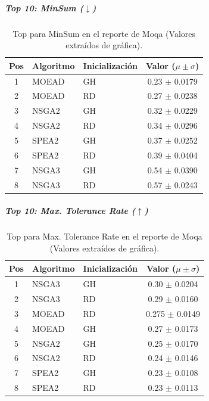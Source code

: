 \documentclass[a4paper,10pt]{article}
\begin{document}
\subparagraph{Top 10: MinSum ($\downarrow$)}
\begin{table}[H]
    \centering
    \begin{tabular}{cllc}
        \toprule
        Pos & Algoritmo & Inicialización & Valor ($\mu \pm \sigma$) \\
        \midrule
        1 & MOEAD & GH & 0.23 $\pm$ 0.0179 \\
        2 & MOEAD & RD & 0.27 $\pm$ 0.0238 \\
        3 & NSGA2 & GH & 0.32 $\pm$ 0.0229 \\
        4 & NSGA2 & RD & 0.34 $\pm$ 0.0296 \\
        5 & SPEA2 & GH & 0.37 $\pm$ 0.0252 \\
        6 & SPEA2 & RD & 0.39 $\pm$ 0.0404 \\
        7 & NSGA3 & GH & 0.54 $\pm$ 0.0390 \\
        8 & NSGA3 & RD & 0.57 $\pm$ 0.0243 \\
        \bottomrule
    \end{tabular}
    \caption{Top para MinSum en el reporte de Moqa (Valores extraídos de gráfica).}
\end{table}

\subparagraph{Top 10: Max. Tolerance Rate ($\uparrow$)}
\begin{table}[H]
    \centering
    \begin{tabular}{cllc}
        \toprule
        Pos & Algoritmo & Inicialización & Valor ($\mu \pm \sigma$) \\
        \midrule
        1 & NSGA3 & GH & 0.30 $\pm$ 0.0204 \\
        2 & NSGA3 & RD & 0.29 $\pm$ 0.0160 \\
        3 & MOEAD & RD & 0.275 $\pm$ 0.0149 \\
        4 & MOEAD & GH & 0.27 $\pm$ 0.0173 \\
        5 & NSGA2 & GH & 0.25 $\pm$ 0.0170 \\
        6 & NSGA2 & RD & 0.24 $\pm$ 0.0146 \\
        7 & SPEA2 & GH & 0.23 $\pm$ 0.0108 \\
        8 & SPEA2 & RD & 0.23 $\pm$ 0.0113 \\
        \bottomrule
    \end{tabular}
    \caption{Top para Max. Tolerance Rate en el reporte de Moqa (Valores extraídos de gráfica).}
\end{table}
\end{document}
